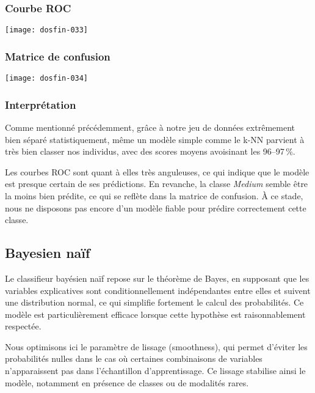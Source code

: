 \documentclass[a4paper,11pt]{article}
\begin{document}
\subsubsection{Courbe ROC}

\begin{center}

\texttt{[image: dosfin-033]}

\end{center}

\subsubsection{Matrice de confusion}

\begin{center}

\texttt{[image: dosfin-034]}

\end{center}

\subsubsection{Interprétation}

Comme mentionné précédemment, grâce à notre jeu de données extrêmement bien séparé statistiquement, même un modèle simple comme le k-NN parvient à très bien classer nos individus, avec des scores moyens avoisinant les 96--97\,\%.

Les courbes ROC sont quant à elles très anguleuses, ce qui indique que le modèle est presque certain de ses prédictions. En revanche, la classe \textit{Medium} semble être la moins bien prédite, ce qui se reflète dans la matrice de confusion. À ce stade, nous ne disposons pas encore d’un modèle fiable pour prédire correctement cette classe.

\newpage

\subsection{Bayesien naïf}

Le classifieur bayésien naïf repose sur le théorème de Bayes, en supposant que les variables explicatives sont conditionnellement indépendantes entre elles et suivent une distribution normal, ce qui simplifie fortement le calcul des probabilités. Ce modèle est particulièrement efficace lorsque cette hypothèse est raisonnablement respectée.

Nous optimisons ici le paramètre de lissage (smoothness), qui permet d’éviter les probabilités nulles dans le cas où certaines combinaisons de variables n’apparaissent pas dans l’échantillon d’apprentissage. Ce lissage stabilise ainsi le modèle, notamment en présence de classes ou de modalités rares.
\end{document}
